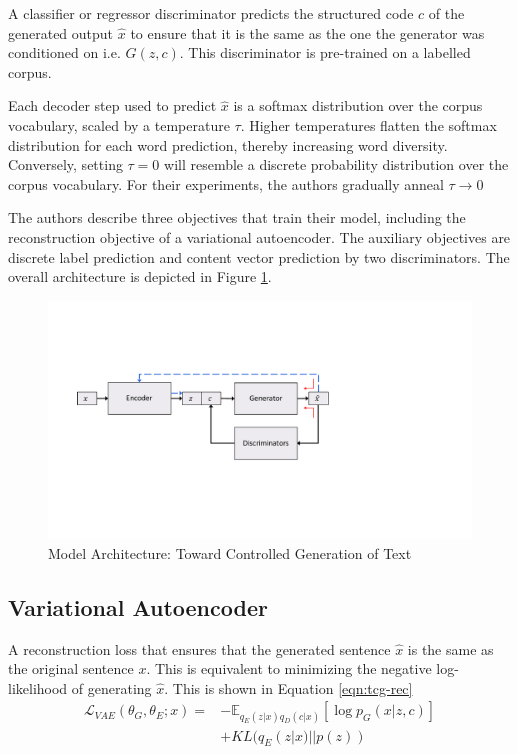 A classifier or regressor discriminator predicts the structured code $c$ of the generated output $\hat{x}$ to ensure that it is the same as the one the generator was conditioned on i.e. $G(z, c)$. This discriminator is pre-trained on a labelled corpus.

Each decoder step used to predict $\hat{x}$ is a softmax distribution over the corpus vocabulary, scaled by a temperature $\tau$. Higher temperatures flatten the softmax distribution for each word prediction, thereby increasing word diversity. Conversely, setting $\tau = 0$ will resemble a discrete probability distribution over the corpus vocabulary. For their experiments, the authors gradually anneal $\tau \rightarrow 0$

The authors describe three objectives that train their model, including the reconstruction objective of a variational autoencoder. The auxiliary objectives are discrete label prediction and content vector prediction by two discriminators. The overall architecture is depicted in Figure \ref{fig:tcg-architecture}.

\begin{figure}[ht]
	\centering
	\includegraphics[width=\textwidth]{images/tcg-architecture}
	\caption{\label{fig:tcg-architecture} Model Architecture: Toward Controlled Generation of Text}
\end{figure}

\subsection{Variational Autoencoder}

A reconstruction loss that ensures that the generated sentence $\hat{x}$ is the same as the original sentence $x$. This is equivalent to minimizing the negative log-likelihood of generating $\hat{x}$. This is shown in Equation \ref{eqn:tcg-rec}
\begin{align} \label{eqn:tcg-rec}
	\mathcal{L}_{VAE}(\theta_G, \theta_E; x) = &
	- \mathbb{E}_{q_E(z|x)q_D(c|x)}[\log p_G(x|z,c)]  \nonumber \\ &
	+ KL(q_E(z|x)||p(z))
\end{align}


